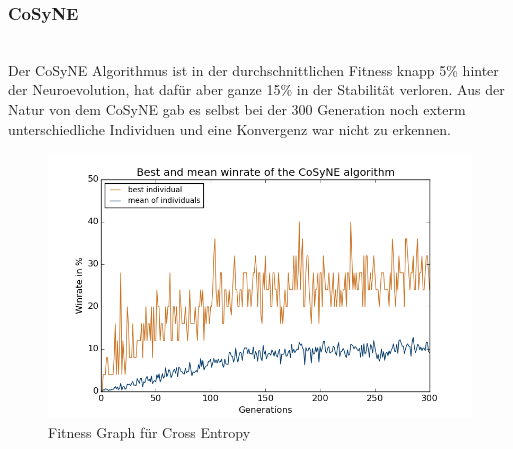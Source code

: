             \subsubsection*{CoSyNE}
                \begin{multicols}{2}
                    \noindent
                    \\[5mm]
                    Der CoSyNE Algorithmus ist in der durchschnittlichen Fitness knapp 5\% hinter der Neuroevolution, hat dafür aber ganze 15\% in der Stabilität verloren. Aus der Natur von dem CoSyNE gab es selbst bei der 300 Generation noch exterm unterschiedliche Individuen und eine Konvergenz war nicht zu erkennen. 
                    \begin{figure}[H]
                       \includegraphics[scale=0.5]{../pictures/summary/cosyne-fitness.png}
                       \caption{Fitness Graph für Cross Entropy}\label{fig:graph-co}
                    \end{figure}
                \end{multicols}

